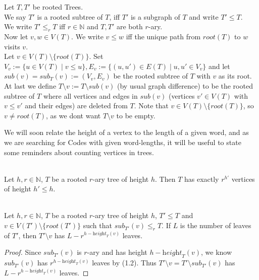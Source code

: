 \documentclass[12pt]{article}
\newcommand{\he}[0]{\textit{height}}
\newcommand{\ro}[0]{\textit{root}}
\newcommand{\SUB}[0]{\textit{sub}}
\newenvironment{statement3}[3]{\begin{trivlist}
\item[\hskip \labelsep {\bfseries #1}\hskip \labelsep {\bfseries #2} {#3}\textbf{.}]}{\end{trivlist}}
\begin{document}
\begin{statement3}{(1.1)}{Definition}{(Subtrees and Ordering)} Let $T, T'$ be rooted Trees.\\
    We say $T'$ is a rooted subtree of $T$, iff $T'$ is a subgraph of $T$ and write $T' \leq T$.\\
    We write $T' \leq_r T$ iff $r \in \mathbb{N}$ and $T,T'$ are both $r$-ary.\\
    Now let $v,w \in V(T)$.
    We write $v \leq w$ iff the unique path from $\ro(T)$ to $w$ visits $v$.\\[8pt]
    Let $v \in V(T) \setminus \{\ro(T)\}$. Set
    $V_v := \{u \in V(T) \mid v \leq u\}, E_v := \{(u,u') \in E(T) \mid u,u' \in V_v\}$
    and let $\SUB(v) = \SUB_T(v) := (V_v, E_v)$ be the rooted subtree of $T$ with $v$ as its root.\\[8pt]
    At last we define $T \setminus v := T \setminus \SUB(v)$ (by usual graph difference) to be the rooted subtree of $T$
    where all vertices and edges in $\SUB(v)$ (vertices $v' \in V(T)$ with $v \leq v'$ and their edges)
    are deleted from $T$. Note that $v \in V(T) \setminus \{\ro(T)\}$, so $v \neq \ro(T)$,
    as we dont want $T \setminus v$ to be empty.
\end{statement3}

\newpage

We will soon relate the height of a vertex to the length of a given word, and as we are searching for Codes
with given word-lengths, it will be useful to state some reminders about counting vertices in trees.

\begin{statement3}{(1.2)}{Reminder}{(Number of vertices of some height in rooted r-ary Trees)}\strut\\[2pt]
    Let $h,r \in \mathbb{N}$, $T$ be a rooted $r$-ary tree of height $h$.
    Then $T$ has exactly $r^{h'}$ vertices of height $h' \leq h$.
\end{statement3}

\begin{statement3}{(1.3)}{Corollary}{(Number of Leaves of $T \setminus v$)}\strut\\[2pt]
    Let $h,r \in \mathbb{N}$, $T$ be a rooted $r$-ary tree of height $h$, $T' \leq T$ and
    $v \in V(T') \setminus \{\ro(T')\}$ such that $\SUB_{T'}(v) \leq_r T$.
    If $L$ is the number of leaves of $T'$, then $T' \setminus v$ has $L - r^{h - \he_T(v)}$ leaves.

    \begin{proof}
        Since $\SUB_{T'}(v)$ is $r$-ary and has height $h - \he_T(v)$, we know $\SUB_{T'}(v)$ has
        $r^{h- \he_T(v)}$ leaves by (1.2).
        Thus $T' \setminus v = T' \setminus \SUB_{T'}(v)$ has $L - r^{h-\he_T(v)}$ leaves.
    \end{proof}
\end{statement3}
\end{document}
